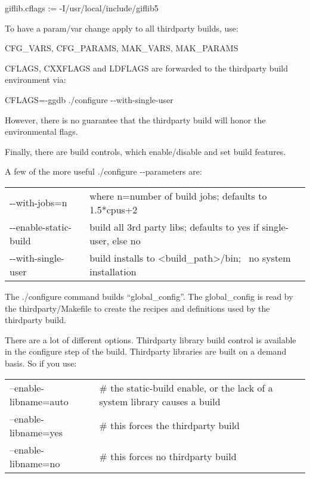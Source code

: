 \hspace{2em}giflib.cflags := -I/usr/local/include/giflib5
\medskip

To have a param/var change apply to all thirdparty builds, use:
\medskip

\hspace{2em}CFG\_VARS, CFG\_PARAMS, MAK\_VARS, MAK\_PARAMS
\medskip

CFLAGS, CXXFLAGS and LDFLAGS are forwarded to the thirdparty build environment via:
\medskip

\hspace{2em}CFLAGS=-ggdb ./configure -{}-with-single-user
\medskip

However, there is no guarantee that the thirdparty build will honor the environmental flags.

Finally, there are build controls, which enable/disable and set build features.
\bigskip

A few of the more useful ./configure -{}-parameters are:
\smallskip

\hspace{2em}
\begin{tabular}{@{}ll}
	{}-{}-with-jobs=n & where n=number of build jobs; defaults to 1.5*cpus+2\\
	{}-{}-enable-static-build & build all 3rd party libs; defaults to yes if single-user, else no\\
	{}-{}-with-single-user& build installs to {\textless}build\_path{\textgreater}/bin; \ no system installation\\
\end{tabular}

\medskip

The ./configure command builds ``global\_config''. The global\_config is read by the thirdparty/Makefile to create the recipes and definitions used by the thirdparty build.
\medskip

There are a lot of different options.  Thirdparty library build control is available in the configure step of the build.  Thirdparty libraries are built on a demand basis.  So if you use:
\medskip

\hspace{2em}
\begin{tabular}{@{}ll}
  --enable-libname=auto & \# the static-build enable, or the lack of a system library causes a build\\
  --enable-libname=yes  &  \# this forces the thirdparty build\\
  --enable-libname=no   &  \# this forces no thirdparty build\\
\end{tabular}
\medskip

